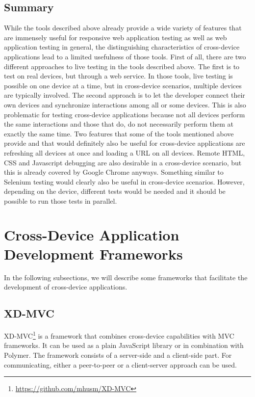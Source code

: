 \subsection{Summary}

While the tools described above already provide a wide variety of features that are immensely useful for responsive web application testing as well as web application testing in general, the distinguishing characteristics of cross-device applications lead to a limited usefulness of those tools. First of all, there are two different approaches to live testing in the tools described above. The first is to test on real devices, but through a web service. In those tools, live testing is possible on one device at a time, but in cross-device scenarios, multiple devices are typically involved. The second approach is to let the developer connect their own devices and synchronize interactions among all or some devices. This is also problematic for testing cross-device applications because not all devices perform the same interactions and those that do, do not necessarily perform them at exactly the same time. Two features that some of the tools mentioned above provide and that would definitely also be useful for cross-device applications are refreshing all devices at once and loading a URL on all devices. Remote HTML, CSS and Javascript debugging are also desirable in a cross-device scenario, but this is already covered by Google Chrome anyways. Something similar to Selenium testing would clearly also be useful in cross-device scenarios. However, depending on the device, different tests would be needed and it should be possible to run those tests in parallel.

\section{Cross-Device Application Development Frameworks}

In the following subsections, we will describe some frameworks that facilitate the development of cross-device applications.

\subsection{XD-MVC}

XD-MVC\footnote{\url{https://github.com/mhusm/XD-MVC}} is a framework that combines cross-device capabilities with MVC frameworks. It can be used as a plain JavaScript library or in combination with Polymer. The framework consists of a server-side and a client-side part. For communicating, either a peer-to-peer or a client-server approach can be used.

